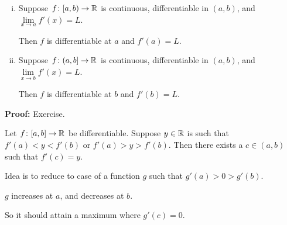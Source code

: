 \documentclass[10pt,aspectratio=169]{beamer}
\begin{document}
\begin{frame}

\begin{proposition}
\begin{enumerate}[(i)]
\item
\pause
Suppose $f \colon [a,b) \to {\mathbb{R}}$ is continuous, differentiable in $(a,b)$,
and $\lim\limits_{x \to a} f'(x) = L$.

\pause
Then $f$ is differentiable at $a$ and $f'(a) = L$.
\item
\pause
Suppose $f \colon (a,b] \to {\mathbb{R}}$ is continuous, differentiable in $(a,b)$,
and $\lim\limits_{x \to b} f'(x) = L$.

\pause
Then $f$ is differentiable at $b$ and $f'(b) = L$.
\end{enumerate}
\end{proposition}

\pause
\textbf{Proof:} Exercise.

\end{frame}

\begin{frame}

\begin{theorem}[Darboux]
Let $f \colon [a,b] \to {\mathbb{R}}$ be differentiable.  Suppose $y \in {\mathbb{R}}$ is such
that $f'(a) < y < f'(b)$ or
$f'(a) > y > f'(b)$.
\pause
Then there exists a $c \in (a,b)$ such that $f'(c) =
y$.
\end{theorem}

\pause
Idea is to reduce to case of a function $g$ such that
$g'(a) > 0 > g'(b)$.

\pause
\medskip

$g$ increases at $a$, and decreases at $b$.

\pause
\medskip

So it should attain a maximum where $g'(c) = 0$.

\pause
\medskip

\begin{center}
\end{center}

\end{frame}
\end{document}
